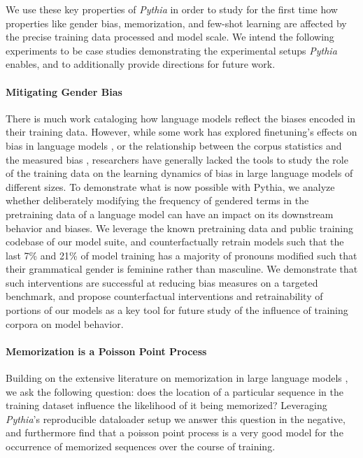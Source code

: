 \documentclass{article}
\theoremstyle{plain}
\theoremstyle{definition}
\theoremstyle{remark}
\begin{document}
We use these key properties of \textit{Pythia} in order to study for the first time how properties like gender bias, memorization, and few-shot learning are affected by the precise training data processed and model scale. We intend the following experiments to be case studies demonstrating the experimental setups \textit{Pythia} enables, and to additionally provide directions for future work.

\paragraph{Mitigating Gender Bias} There is much work cataloging how language models reflect the biases encoded in their training data. However, while some work has explored finetuning's effects on bias in language models \citep{gira2022debiasing,kirtane2022efficient,choenni2021stepmothers}, or the relationship between the corpus statistics and the measured bias \citep{bordia2019identifying,wal2022birth}, researchers have generally lacked the tools to study the role of the training data on the learning dynamics of bias in large language models of different sizes. To demonstrate what is now possible with Pythia, we analyze whether deliberately modifying the frequency of gendered terms in the pretraining data of a language model can have an impact on its downstream behavior and biases. We leverage the known pretraining data and public training codebase of our model suite, and counterfactually retrain models such that the last 7\% and 21\% of model training has a majority of pronouns modified such that their grammatical gender is feminine rather than masculine. We demonstrate that such interventions are successful at reducing bias measures on a targeted benchmark, and propose counterfactual interventions and retrainability of portions of our models as a key tool for future study of the influence of training corpora on model behavior.

\paragraph{Memorization is a Poisson Point Process} Building on the extensive literature on memorization in large language models \citep{carlini2019secret,carlini2021extracting,hu2022membership}, we ask the following question: does the location of a particular sequence in the training dataset influence the likelihood of it being memorized? Leveraging \textit{Pythia}'s reproducible dataloader setup we answer this question in the negative, and furthermore find that a poisson point process is a very good model for the occurrence of memorized sequences over the course of training.
\end{document}
